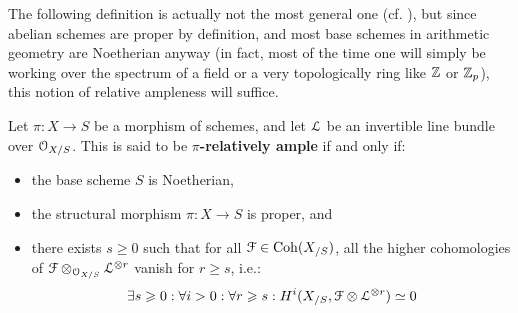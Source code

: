                     The following definition is actually not the most general one (cf. \cite[\href{https://stacks.math.columbia.edu/tag/01VG}{Tag 01VG}]{stacks}), but since abelian schemes are proper by definition, and most base schemes in arithmetic geometry are Noetherian anyway (in fact, most of the time one will simply be working over the spectrum of a field or a very topologically  ring like $\mathbb{Z}$ or $\mathbb{Z}_p$), this notion of relative ampleness will suffice.
                    \begin{definition} \label{def: relatively_ample_line_bundles}
                        Let $\pi: X \to S$ be a morphism of schemes, and let $\mathcal{L}$ be an invertible line bundle over $\mathcal{O}_{X/S}$. This is said to be \textbf{$\pi$-relatively ample} if and only if:
                            \begin{itemize}
                                \item the base scheme $S$ is Noetherian,
                                \item the structural morphism $\pi: X \to S$ is proper, and
                                \item there exists $s \geq 0$ such that for all $\mathcal{F} \in \mathrm{Coh}(X_{/S})$, all the higher cohomologies of $\calF \tensor_{\calO_{X/S}} \calL^{\tensor r}$ vanish for $r \geq s$, i.e.:
                                    $$\exists s \geq 0: \forall i > 0: \forall r \geq s: H^i(X_{/S}, \calF \tensor \calL^{\tensor r}) \cong 0$$
                            \end{itemize}
                    \end{definition}
